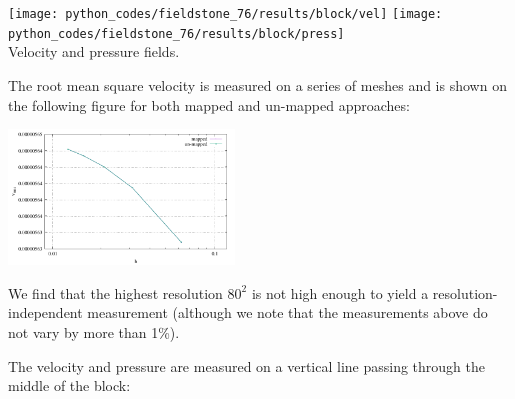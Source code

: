 \begin{center}
\texttt{[image: python\_codes/fieldstone\_76/results/block/vel]}
\texttt{[image: python\_codes/fieldstone\_76/results/block/press]}\\
{\captionfont Velocity and pressure fields.}
\end{center}

The root mean square velocity is measured on a series of meshes 
and is shown on the following figure for both mapped and un-mapped approaches: 

\begin{center}
\includegraphics[width=6cm]{python_codes/fieldstone_76/results/block/vrms.pdf}
\end{center}

We find that the highest resolution $80^2$ is not high enough to yield a resolution-independent
measurement (although we note that the measurements above do not vary by more than 1\%). 

The velocity and pressure are measured on a vertical line passing through the 
middle of the block:

